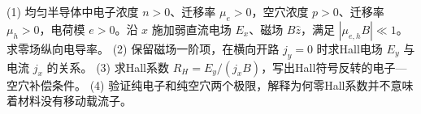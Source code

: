 (1) 均匀半导体中电子浓度 \(n>0\)、迁移率 \(\mu_e>0\)，空穴浓度 \(p>0\)、迁移率 \(\mu_h>0\)，电荷模 \(e>0\)。沿 \(x\) 施加弱直流电场 \(E_x\)、磁场 \(B\hat z\)，满足 \(|\mu_{e,h}B|\ll1\)。求零场纵向电导率。
(2) 保留磁场一阶项，在横向开路 \(j_y=0\) 时求Hall电场 \(E_y\) 与电流 \(j_x\) 的关系。
(3) 求Hall系数 \(R_H=E_y/(j_xB)\)，写出Hall符号反转的电子—空穴补偿条件。
(4) 验证纯电子和纯空穴两个极限，解释为何零Hall系数并不意味着材料没有移动载流子。
